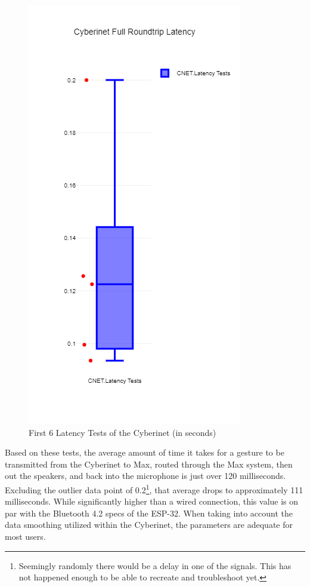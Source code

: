 \begin{figure}
    \centering
    \includegraphics[scale=0.5]{newplot.png}
    \caption{First 6 Latency Tests of the Cyberinet (in seconds)}
    \label{fig:latencyTest1}
\end{figure}

Based on these tests, the average amount of time it takes for a gesture to be transmitted from the Cyberinet to Max, routed through the Max system, then out the speakers, and back into the microphone is just over 120 milliseconds. Excluding the outlier data point of 0.2\footnote{Seemingly randomly there would be a delay in one of the signals. This has not happened enough to be able to recreate and troubleshoot yet.}, that average drops to approximately 111 milliseconds. While significantly higher than a wired connection, this value is on par with the Bluetooth 4.2 specs\cite{btSpecs} of the ESP-32. When taking into account the data smoothing utilized within the Cyberinet, the parameters are adequate for most users.

